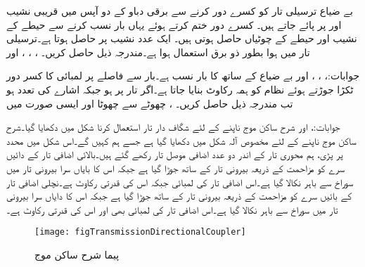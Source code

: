 بے ضیاع  ترسیلی تار کو کسرے دور کرنے سے برقی دباو کے دو آپس میں قریبی نشیب  اور  پر پائے جاتے ہیں۔ کسرے دور ختم کرتے ہوئے یہاں بار نسب کرنے سے  حیطے کے نشیب اور  حیطے کے چوٹیاں حاصل ہوتی ہیں۔ ایک عدد نشیب  پر حاصل ہوتا ہے۔ترسیلی تار میں ہوا بطور ذو برق استعمال ہوا ہے۔مندرجہ ذیل حاصل کریں۔ ، ، ،  اور 

جوابات:، ، ،
  اور 
بے ضیاع  کے ساتھ  کا بار نسب ہے۔بار سے  فاصلے پر  لمبائی کا کسر دور ٹکڑا جوڑتے ہوئے نظام کو ہمہ رکاوٹ بنایا جاتا ہے۔اگر تار پر  ہو جبکہ اشارے کی تعدد  ہو تب مندرجہ ذیل حاصل کریں۔ ، چھوٹے سے چھوٹا  اور ایسی صورت میں 

جوابات:،  اور 
شرح ساکن موج ناپنے کے لئے شگاف دار تار استعمال کرنا شکل  میں دکھایا گیا۔شرح ساکن موج ناپنے کے لئے مخصوص آلہ شکل  میں دکھایا گیا ہے جسے ہم  کہیں گے۔اس شکل میں  محدد پر پڑی، ہم محوری تار کے اندر دو عدد اضافی موصل تار رکھے گئے ہیں۔بالائی اضافی تار کے دائیں سرے کو مزاحمت  کے ذریعہ بیرونی تار کے ساتھ جوڑا گیا ہے جبکہ اس کا بایاں سرا بیرونی تار میں سوراخ سے باہر نکالا گیا ہے۔اس اضافی تار کی لمبائی  جبکہ اس کی قدرتی رکاوٹ  ہے۔نچلی اضافی تار کے بائیں سرے کو مزاحمت  کے ذریعہ بیرونی تار کے ساتھ جوڑا گیا ہے جبکہ اس کا دایاں سرا بیرونی تار میں سوراخ سے باہر نکالا گیا ہے۔اس اضافی تار کی لمبائی بھی  اور اس کی قدرتی رکاوٹ  ہے۔

\begin{figure}
\centering
\texttt{[image: figTransmissionDirectionalCoupler]}
\caption{پیما شرح ساکن موج}
\label{شکل_ترسیلی_آلہ_پیما_شرح_ساکن_موج}
\end{figure}

